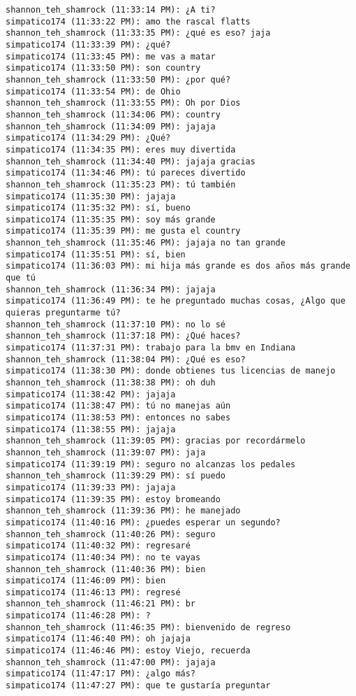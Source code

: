 \begin{verbatim}
shannon_teh_shamrock (11:33:14 PM): ¿A ti?
simpatico174 (11:33:22 PM): amo the rascal flatts
shannon_teh_shamrock (11:33:35 PM): ¿qué es eso? jaja
simpatico174 (11:33:39 PM): ¿qué?
simpatico174 (11:33:45 PM): me vas a matar
simpatico174 (11:33:50 PM): son country
shannon_teh_shamrock (11:33:50 PM): ¿por qué?
simpatico174 (11:33:54 PM): de Ohio
shannon_teh_shamrock (11:33:55 PM): Oh por Dios
shannon_teh_shamrock (11:34:06 PM): country
shannon_teh_shamrock (11:34:09 PM): jajaja
simpatico174 (11:34:29 PM): ¿Qué?
simpatico174 (11:34:35 PM): eres muy divertida
shannon_teh_shamrock (11:34:40 PM): jajaja gracias
simpatico174 (11:34:46 PM): tú pareces divertido
shannon_teh_shamrock (11:35:23 PM): tú también
simpatico174 (11:35:30 PM): jajaja
simpatico174 (11:35:32 PM): sí, bueno
simpatico174 (11:35:35 PM): soy más grande
simpatico174 (11:35:39 PM): me gusta el country
shannon_teh_shamrock (11:35:46 PM): jajaja no tan grande
simpatico174 (11:35:51 PM): sí, bien
simpatico174 (11:36:03 PM): mi hija más grande es dos años más grande que tú
shannon_teh_shamrock (11:36:34 PM): jajaja
simpatico174 (11:36:49 PM): te he preguntado muchas cosas, ¿Algo que quieras preguntarme tú?
shannon_teh_shamrock (11:37:10 PM): no lo sé
shannon_teh_shamrock (11:37:18 PM): ¿Qué haces?
simpatico174 (11:37:31 PM): trabajo para la bmv en Indiana
shannon_teh_shamrock (11:38:04 PM): ¿Qué es eso?
simpatico174 (11:38:30 PM): donde obtienes tus licencias de manejo
shannon_teh_shamrock (11:38:38 PM): oh duh
simpatico174 (11:38:42 PM): jajaja
simpatico174 (11:38:47 PM): tú no manejas aún
simpatico174 (11:38:53 PM): entonces no sabes
simpatico174 (11:38:55 PM): jajaja
shannon_teh_shamrock (11:39:05 PM): gracias por recordármelo
shannon_teh_shamrock (11:39:07 PM): jaja
simpatico174 (11:39:19 PM): seguro no alcanzas los pedales
shannon_teh_shamrock (11:39:29 PM): sí puedo
simpatico174 (11:39:33 PM): jajaja
simpatico174 (11:39:35 PM): estoy bromeando
shannon_teh_shamrock (11:39:36 PM): he manejado
simpatico174 (11:40:16 PM): ¿puedes esperar un segundo?
shannon_teh_shamrock (11:40:26 PM): seguro
simpatico174 (11:40:32 PM): regresaré
simpatico174 (11:40:34 PM): no te vayas
shannon_teh_shamrock (11:40:36 PM): bien
simpatico174 (11:46:09 PM): bien
simpatico174 (11:46:13 PM): regresé
shannon_teh_shamrock (11:46:21 PM): br
simpatico174 (11:46:28 PM): ?
shannon_teh_shamrock (11:46:35 PM): bienvenido de regreso
simpatico174 (11:46:40 PM): oh jajaja
simpatico174 (11:46:46 PM): estoy Viejo, recuerda
shannon_teh_shamrock (11:47:00 PM): jajaja
simpatico174 (11:47:17 PM): ¿algo más?
simpatico174 (11:47:27 PM): que te gustaría preguntar

\end{verbatim}
